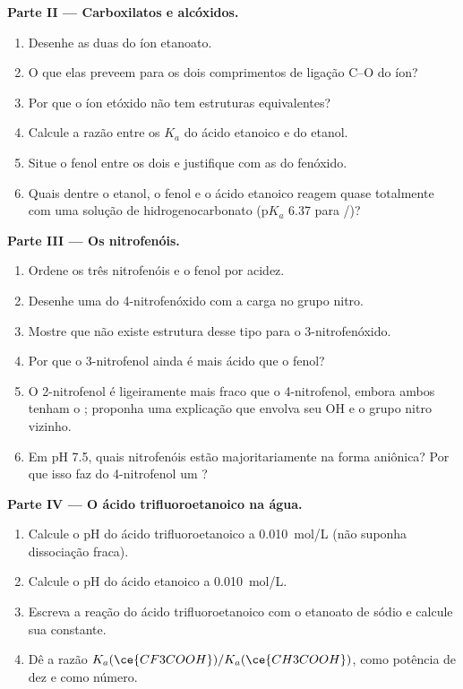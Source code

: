 \begin{problem}
\medskip
\noindent\textbf{Parte II --- Carboxilatos e alcóxidos.}
\begin{enumerate}[resume]
  \item Desenhe as duas  do íon etanoato.
  \item O que elas preveem para os dois comprimentos de ligação C--O do
        íon?
  \item Por que o íon etóxido não tem estruturas equivalentes?
  \item Calcule a razão entre os $K_a$ do ácido etanoico e do etanol.
  \item Situe o fenol entre os dois e justifique com as  do fenóxido.
  \item Quais dentre o etanol, o fenol e o ácido etanoico reagem quase
        totalmente com uma solução de hidrogenocarbonato ($\mathrm{p}K_a$
        6.37 para
        /)?
\end{enumerate}

\medskip
\noindent\textbf{Parte III --- Os nitrofenóis.}
\begin{enumerate}[resume]
  \item Ordene os três nitrofenóis e o fenol por acidez.
  \item Desenhe uma  do 4-nitrofenóxido com a
        carga no grupo nitro.
  \item Mostre que não existe estrutura desse tipo para o
        3-nitrofenóxido.
  \item Por que o 3-nitrofenol ainda é mais ácido que o fenol?
  \item O 2-nitrofenol é ligeiramente mais fraco que o 4-nitrofenol,
        embora ambos tenham o ; proponha uma explicação
        que envolva seu OH e o grupo nitro vizinho.
  \item Em pH 7.5, quais nitrofenóis estão majoritariamente na forma
        aniônica? Por que isso faz do 4-nitrofenol um ?
\end{enumerate}

\medskip
\noindent\textbf{Parte IV --- O ácido trifluoroetanoico na água.}
\begin{enumerate}[resume]
  \item Calcule o pH do ácido trifluoroetanoico a \qty{0.010}{mol/L}
        (não suponha dissociação fraca).
  \item Calcule o pH do ácido etanoico a \qty{0.010}{mol/L}.
  \item Escreva a reação do ácido trifluoroetanoico com o etanoato de
        sódio e calcule sua constante.
  \item Dê a razão $K_a(\ce{CF3COOH})/K_a(\ce{CH3COOH})$, como potência
        de dez e como número.
\end{enumerate}
\end{problem}
